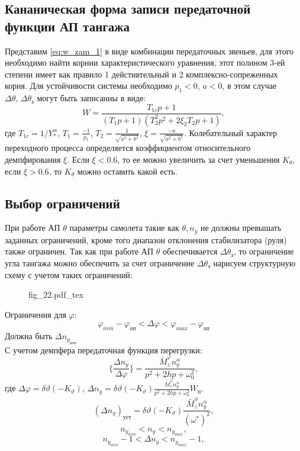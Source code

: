 \documentclass{article}
\begin{document}
\subsection{Кананическая форма записи передаточной функции АП тангажа}
Представим \ref{eq:w_zam_1} в виде комбинации передаточных звеньев, для этого необходимо найти корнии характеристического уравнения, этот полином 3-ей степени имеет как правило 1 дейстивтельный и 2 комплексно-сопреженных корня. Для устойчивости системы необходимо $p_1 < 0, \, a<0$, в этом случае $\Delta \theta, \, \Delta \theta_з$ могут быть записанны в виде:
\[
W = \frac{T_{1c} p + 1}{(T_{1}p + 1)(T_2^2 p^2 + 2 \xi_2 T_2 p + 1)}, 
\]
где $T_{1c} = 1/Y_*^\alpha$, $T_1 = \frac{-1}{p_1}$, $T_2 = \frac{1}{\sqrt{a^2 + b^2}}$, $\xi = \frac{-a}{\sqrt{a^2 + b^2}}$.
Колебательный характер переходного процесса определяется коэффициентом относительного демпфирования $\xi$. Если $\xi < 0.6$, то ее можно увеличить за счет уменьшения $K_\theta$, если $\xi > 0.6$, то $K_\theta$ можно оставить какой есть.
\subsection{Выбор ограничений}
При работе АП $\theta$ параметры самолета такие как $\theta, n_y$ не должны превышать заданных ограничений, кроме того диапазон отклонения стабилизатора (руля) также ограничен. Так как при работе АП $\theta$ обеспечивается $\Delta \theta_з$, то ограничение угла тангажа можно обеспечить за счет ограничение $\Delta \theta_з$ нарисуем структурную схему с учетом таких ограничений:

\begin{figure}[H]
\centering
{fig_22.pdf_tex}
\end{figure}

Ограничения для $\varphi$:
\[ \varphi_{min} - \varphi_{оп} < \Delta \varphi < \varphi_{max} - \varphi_{оп}\]
Должна быть $\Delta n_{y_{доп}}$\\
С учетом демпфера передаточная функция перегрузки: 
\[
\{\frac{\Delta n_y}{\Delta \varphi}\} = \frac{\bar{M}_z^\varphi n_y^\alpha}{p^2 + 2hp + \omega_0^2},
\]
где $\Delta \varphi = \delta \vartheta (-K_\vartheta)$, $\Delta n_y = \delta \vartheta (-K_\vartheta ) \frac{\bar{M}_z^\varphi n_y^\alpha}{p^2 + 2hp + \omega_0^2}W_п$.
\[
(\Delta n_y)_{уст} = \delta \vartheta (- K_\vartheta)\frac{\bar{M}_z^\phi n_y^\alpha}{(\omega^*)^2},
\]
\[
n_{{y}_{min}} < n_y < n_{{y}_{max}},
\]
\[
n_{{y}_{min}} - 1< \Delta n_y < n_{{y}_{max}} - 1,
\]
\end{document}
